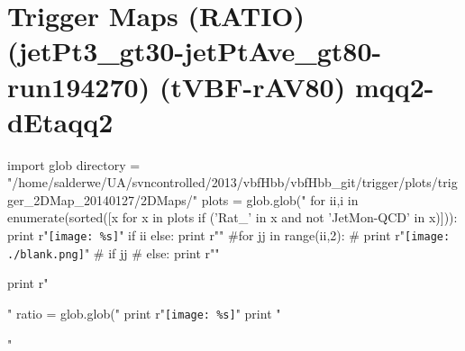 \documentclass[12pt,english,dvipsnames]{beamer}
\newcommand{\UAoverlay}[0]{%
\begin{tikzpicture}[remember picture,overlay,shift={(current page.north east)}]
\node (zero) at (-1.8cm,-0.93cm) {\texttt{[image: ../logos/CMS.pdf]}\hspace{0.15cm}\texttt{[image: ../logos/CERN.pdf]}\hspace{0.15cm}\texttt{[image: ../logos/UA.pdf]}}; 
\end{tikzpicture}
}
\begin{document}
\section{Trigger Maps (RATIO) (jetPt3\_gt30-jetPtAve\_gt80-run194270) (tVBF-rAV80) mqq2-dEtaqq2}
\begin{frame}[t,fragile]%
\begin{python}
import glob
directory = "/home/salderwe/UA/svncontrolled/2013/vbfHbb/vbfHbb_git/trigger/plots/trigger_2DMap_20140127/2DMaps/"
plots = glob.glob("%
for ii,i in enumerate(sorted([x for x in plots if ('Rat_' in x and not 'JetMon-QCD' in x)])):
  print r"\texttt{[image: \%s]}"%
  if ii%
  else: print r"\hfill"
#for jj in range(ii,2):
#  print r"\texttt{[image: ./blank.png]}"
#  if jj%
#  else: print r"\hfill"
  
print r"\begin{minipage}{0.9999\textwidth}\centering"
ratio = glob.glob("%
print r"\texttt{[image: \%s]}"%
print "\end{minipage}"
\end{python} 
\end{frame}

\end{document}
